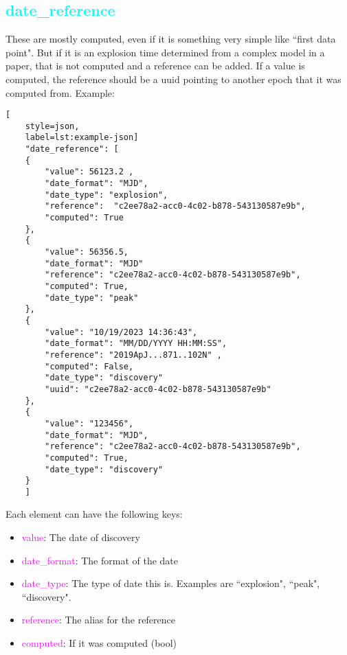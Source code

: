\documentclass[tighten]{aastex631}
\newcommand{\property}[1]{\textcolor{cyan}{#1}}
\newcommand{\element}[1]{\textcolor{orange}{#1}}
\newcommand{\keyword}[1]{\textcolor{magenta}{#1}}
\begin{document}

\subsection{\property{date\_reference}} \label{sec:date_reference}

These are mostly computed, even if it is something very simple like ``first data point". But if it is an explosion time determined from a complex model in a paper, that is not computed and a reference can be added. If a value is computed, the reference should be a uuid pointing to another epoch that it was computed from. Example:

\begin{lstlisting}[
    style=json,
    label=lst:example-json]
    "date_reference": [
    {
        "value": 56123.2 ,
        "date_format": "MJD",
        "date_type": "explosion",
        "reference":  "c2ee78a2-acc0-4c02-b878-543130587e9b",
        "computed": True
    },
    {
        "value": 56356.5,
        "date_format": "MJD"
        "reference": "c2ee78a2-acc0-4c02-b878-543130587e9b",
        "computed": True,
        "date_type": "peak"
    },
    {
        "value": "10/19/2023 14:36:43",
        "date_format": "MM/DD/YYYY HH:MM:SS",
        "reference": "2019ApJ...871..102N" ,
        "computed": False,
        "date_type": "discovery"
        "uuid": "c2ee78a2-acc0-4c02-b878-543130587e9b"
    },
    {
        "value": "123456",
        "date_format": "MJD",
        "reference": "c2ee78a2-acc0-4c02-b878-543130587e9b",
        "computed": True,
        "date_type": "discovery"
    }
    ]
\end{lstlisting}

Each element can have the following keys:
\begin{itemize}
    \item \keyword{value}: The date of discovery
    \item \keyword{date\_format}: The format of the date
    \item \keyword{date\_type}: The type of date this is. Examples are ``explosion", ``peak", ``discovery".
    \item \keyword{reference}: The alias for the reference
    \item \keyword{computed}: If it was computed (bool)
\end{itemize}
\end{document}
